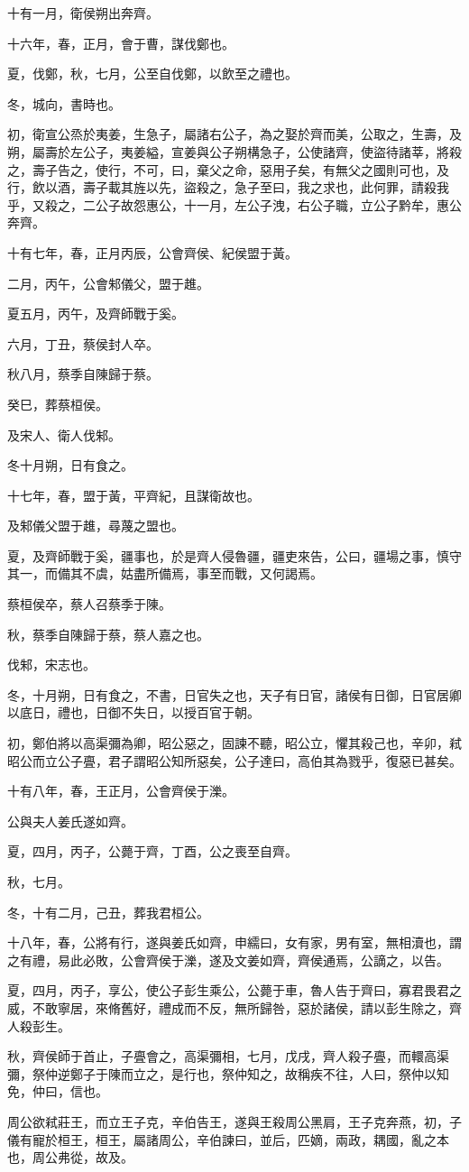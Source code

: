 \begin{pinyinscope}
十有一月，衛侯朔出奔齊。

十六年，春，正月，會于曹，謀伐鄭也。

夏，伐鄭，秋，七月，公至自伐鄭，以飲至之禮也。

冬，城向，書時也。

初，衛宣公烝於夷姜，生急子，屬諸右公子，為之娶於齊而美，公取之，生壽，及朔，屬壽於左公子，夷姜縊，宣姜與公子朔構急子，公使諸齊，使盜待諸莘，將殺之，壽子告之，使行，不可，曰，棄父之命，惡用子矣，有無父之國則可也，及行，飲以酒，壽子載其旌以先，盜殺之，急子至曰，我之求也，此何罪，請殺我乎，又殺之，二公子故怨惠公，十一月，左公子洩，右公子職，立公子黔牟，惠公奔齊。

十有七年，春，正月丙辰，公會齊侯、紀侯盟于黃。

二月，丙午，公會邾儀父，盟于趡。

夏五月，丙午，及齊師戰于奚。

六月，丁丑，蔡侯封人卒。

秋八月，蔡季自陳歸于蔡。

癸巳，葬蔡桓侯。

及宋人、衛人伐邾。

冬十月朔，日有食之。

十七年，春，盟于黃，平齊紀，且謀衛故也。

及邾儀父盟于趡，尋蔑之盟也。

夏，及齊師戰于奚，疆事也，於是齊人侵魯疆，疆吏來告，公曰，疆場之事，慎守其一，而備其不虞，姑盡所備焉，事至而戰，又何謁焉。

蔡桓侯卒，蔡人召蔡季于陳。

秋，蔡季自陳歸于蔡，蔡人嘉之也。

伐邾，宋志也。

冬，十月朔，日有食之，不書，日官失之也，天子有日官，諸侯有日御，日官居卿以底日，禮也，日御不失日，以授百官于朝。

初，鄭伯將以高渠彌為卿，昭公惡之，固諫不聽，昭公立，懼其殺己也，辛卯，弒昭公而立公子亹，君子謂昭公知所惡矣，公子達曰，高伯其為戮乎，復惡已甚矣。

十有八年，春，王正月，公會齊侯于濼。

公與夫人姜氏遂如齊。

夏，四月，丙子，公薨于齊，丁酉，公之喪至自齊。

秋，七月。

冬，十有二月，己丑，葬我君桓公。

十八年，春，公將有行，遂與姜氏如齊，申繻曰，女有家，男有室，無相瀆也，謂之有禮，易此必敗，公會齊侯于濼，遂及文姜如齊，齊侯通焉，公謫之，以告。

夏，四月，丙子，享公，使公子彭生乘公，公薨于車，魯人告于齊曰，寡君畏君之威，不敢寧居，來脩舊好，禮成而不反，無所歸咎，惡於諸侯，請以彭生除之，齊人殺彭生。

秋，齊侯師于首止，子亹會之，高渠彌相，七月，戊戌，齊人殺子亹，而轘高渠彌，祭仲逆鄭子于陳而立之，是行也，祭仲知之，故稱疾不往，人曰，祭仲以知免，仲曰，信也。

周公欲弒莊王，而立王子克，辛伯告王，遂與王殺周公黑肩，王子克奔燕，初，子儀有寵於桓王，桓王，屬諸周公，辛伯諫曰，並后，匹嫡，兩政，耦國，亂之本也，周公弗從，故及。


\end{pinyinscope}